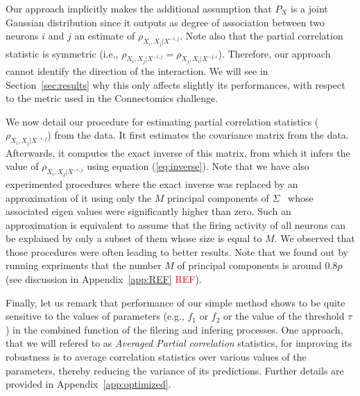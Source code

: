 \documentclass[wcp]{jmlr}
\begin{document}
Our approach implicitly makes the additional assumption  that $P_X$ is  a
joint Gaussian distribution since it  outputs as degree of association
between two neurons $i$ and $j$ an estimate of $\rho_{X_i, X_j | X^{-i,j}}$.
Note also that the partial correlation
statistic is symmetric  (i.e., $\rho_{X_i, X_j | X^{-i,j}} = \rho_{X_j, X_i |
X^{-j,i}}$). Therefore, our approach cannot identify the direction of the interaction. We will see in Section~\ref{sec:results} why this only affects slightly its performances, with respect to the metric used in the Connectomics challenge.

We now detail  our procedure for estimating partial correlation statistics
($\rho_{X_i, X_j | X^{-i,j}}$) from the data. It first estimates the covariance matrix from the data. Afterwards, it computes the exact inverse of this matrix, from which it infers the value of $\rho_{X_i, X_j | X^{-i,j}}$ using  equation (\ref{eq:inverse}). Note that we have also experimented procedures where the exact inverse was replaced by an approximation of it using only the $M$ principal components of $\Sigma$~\citep{bishop2006pattern} whose associated eigen values were significantly higher than zero. Such an approximation is equivalent to assume that the firing activity of all neurons can be explained by only a subset of them whose size is equal to $M$. We observed that those procedures were often leading to better results. Note that we found out by running expriments that the number $M$ of principal components is around $0.8p$
(see discussion in Appendix~\ref{app:REF}
\textcolor{red}{REF}).








Finally, let us remark that performance of our simple method shows to be quite sensitive to the values of parameters (e.g., $f_1$ or
$f_2$ or the value of the threshold $\tau$) in the combined function of the filering and infering processes. One approach, that we will refered to as \textit{Averaged
Partial correlation} statistics, for improving its robustness is to average correlation statistics
over various values of the parameters, thereby reducing the variance of its
predictions. Further details are provided in
Appendix~\ref{app:optimized}.
\end{document}
